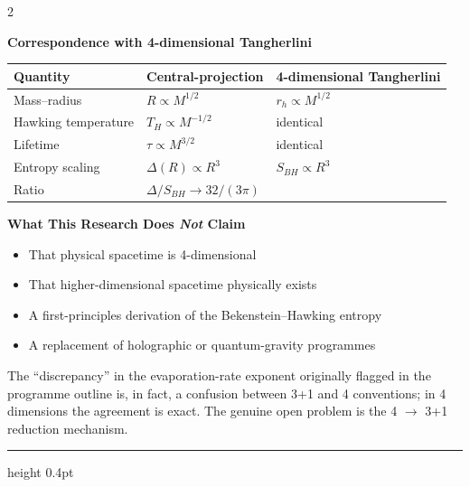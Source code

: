 \documentclass[9pt,a4paper]{article}
\begin{document}
\begin{multicols}{2}
\columnbreak

\textbf{Correspondence with 4-dimensional Tangherlini}

\vspace{1pt}
\begin{center}
\footnotesize
\begin{tabular}{@{}lll@{}}
\toprule
Quantity & Central-projection & 4-dimensional Tangherlini \\
\midrule
Mass--radius & $R \propto M^{1/2}$ & $r_h \propto M^{1/2}$ \\
Hawking temperature & $T_H \propto M^{-1/2}$ & identical \\
Lifetime & $\tau \propto M^{3/2}$ & identical \\
Entropy scaling & $\Delta(R) \propto R^3$ & $S_{BH} \propto R^3$ \\
Ratio & \multicolumn{2}{l}{$\Delta/S_{BH} \to 32/(3\pi)$} \\
\bottomrule
\end{tabular}
\end{center}

\vspace{6pt}
\textbf{What This Research Does \emph{Not} Claim}

\vspace{1pt}
\begin{itemize}[topsep=1pt]
\item That physical spacetime is 4-dimensional
\item That higher-dimensional spacetime physically exists
\item A first-principles derivation of the Bekenstein--Hawking entropy
\item A replacement of holographic or quantum-gravity programmes
\end{itemize}

\vspace{1pt}
{\footnotesize The ``discrepancy'' in the evaporation-rate exponent originally flagged in the programme outline is, in fact, a confusion between 3+1 and 4 conventions; in 4 dimensions the agreement is exact. The genuine open problem is the 4 $\to$ 3+1 reduction mechanism.}

\end{multicols}

\vspace{0pt}
\hrule height 0.4pt
\vspace{3pt}
\end{document}
